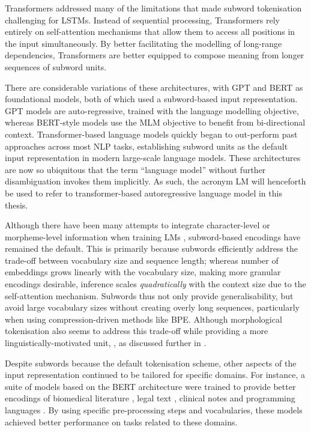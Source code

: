 Transformers \citep{vaswani2017attention} addressed many of the limitations that made subword tokenisation challenging for LSTMs. Instead of sequential processing, Transformers rely entirely on self-attention mechanisms that allow them to access all positions in the input simultaneously. By better facilitating the modelling of long-range dependencies, Transformers are better equipped to compose meaning from longer sequences of subword units. 

There are considerable variations of these architectures, with GPT \citep{radford2018gpt1} and BERT \citep{devlin2019bert} as foundational models, both of which used a subword-based input representation. GPT models are auto-regressive, trained with the language modelling objective, whereas BERT-style models use the MLM objective to benefit from bi-directional context. Transformer-based language models quickly began to out-perform past approaches across most NLP tasks, establishing subword units as the default input representation in modern large-scale language models. These architectures are now so ubiquitous that the term ``language model'' without further disambiguation invokes them implicitly. As such, the acronym LM will henceforth be used to refer to transformer-based autoregressive language model in this thesis.

Although there have been many attempts to integrate character-level or morpheme-level information when training LMs \citep[e.g.][]{ma-etal-2020-charbert, nzeyimana-niyongabo-rubungo-2022-kinyabert}, subword-based encodings have remained the default. This is primarily because subwords efficiently address the trade-off between vocabulary size and sequence length; whereas number of embeddings grows linearly with the vocabulary size, making more granular encodings desirable, inference scales \emph{quadratically} with the context size due to the self-attention mechanism. Subwords thus not only provide generalisability, but avoid large vocabulary sizes without creating overly long sequences, particularly when using compression-driven methods like BPE. Although morphological tokenisation also seems to address this trade-off while providing a more linguistically-motivated unit, \writemore, as discussed further in \writemore.

Despite subwords because the default tokenisation scheme, other aspects of the input representation continued to be tailored for specific domains. For instance, a suite of models based on the BERT architecture were trained to provide better encodings of biomedical literature \citep{lee2020biobert}, legal text \citep{chalkidis2020legal}, clinical notes \citep{alsentzer2019publicly} and programming languages \citep{feng-etal-2020-codebert}. By using specific pre-processing steps and vocabularies, these models achieved better performance on tasks related to these domains.


